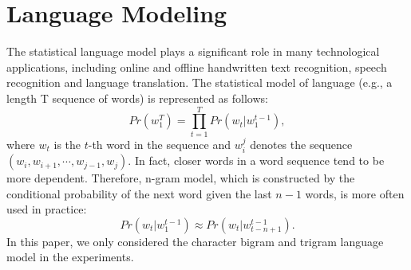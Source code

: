 \documentclass[10pt,conference,a4paper]{IEEEtran}
\begin{document}
\section{Language Modeling}
The statistical language model plays a significant role in many technological applications, including online and offline handwritten text recognition, speech recognition and language translation.
The statistical model of language (e.g., a length T sequence of words) is represented as follows:
\begin{equation}
    \label{EquationLanguageModel}
    Pr(w_{1}^T)=\prod_{t=1}^T Pr(w_t|w_{1}^{t-1}),
\end{equation}
where $w_t$ is the $t$-th word in the sequence and $w_{i}^j$ denotes the sequence $(w_i,w_{i+1},\cdots,w_{j-1},w_{j})$.
In fact, closer words in a word sequence tend to be more dependent.
Therefore, n-gram model, which is constructed by the conditional probability of the next word given the last $n-1$ words, is more often used in practice:
\begin{equation}
    Pr(w_t|w_{1}^{t-1}) \approx Pr(w_t|w_{t-n+1}^{t-1}).
\end{equation}
In this paper, we only considered the character bigram and trigram language model in the experiments.
\end{document}
